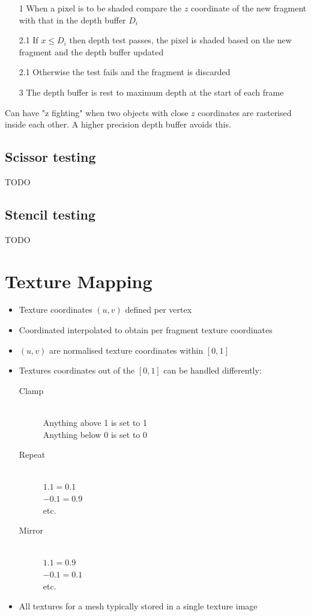 \documentclass[a4paper]{article}
\begin{document}
\begin{enumerate}
  \item[1]   When a pixel is to be shaded compare the $z$ coordinate of the new
    fragment with that in the depth buffer $D_{i}$
  \item[2.1] If $x \leq D_{i}$ then depth test passes, the pixel is shaded based
    on the new fragment and the depth buffer updated
  \item[2.1] Otherwise the test fails and the fragment is discarded
  \item[3]   The depth buffer is rest to maximum depth at the start of each
    frame
\end{enumerate}

Can have "z fighting" when two objects with close $z$ coordinates are rasterised
inside each other. A higher precision depth buffer avoids this.

\subsection{Scissor testing}

TODO

\subsection{Stencil testing}

TODO

\section{Texture Mapping}

\begin{itemize}
  \item Texture coordinates $(u, v)$ defined per vertex
  \item Coordinated interpolated to obtain per fragment texture coordinates
  \item $(u, v)$ are normalised texture coordinates within $[0, 1]$
  \item Textures coordinates out of the $[0, 1]$ can be handled differently:
    \begin{description}
      \item[Clamp] \hfill \\
        Anything above 1 is set to 1 \\
        Anything below 0 is set to 0
      \item[Repeat] \hfill \\
        $1.1 = 0.1$ \\
        $-0.1 = 0.9$ \\
        etc.
      \item[Mirror] \hfill \\
        $1.1 = 0.9$ \\
        $-0.1 = 0.1$ \\
        etc.
    \end{description}
  \item All textures for a mesh typically stored in a single texture image
\end{itemize}
\end{document}

